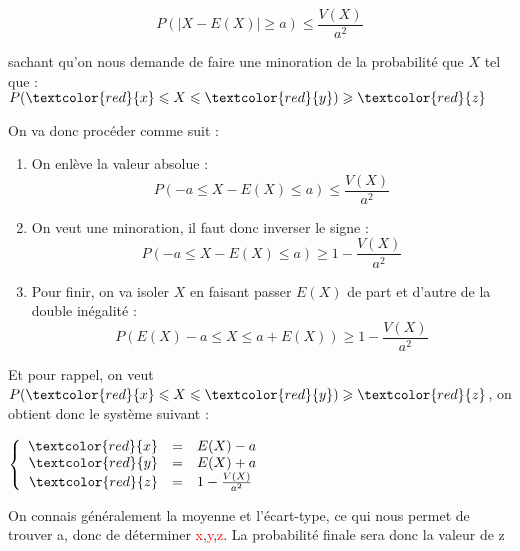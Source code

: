 \documentclass{article}
\newcommand{\argument}[1]{\textcolor{red}{#1}}
\begin{document}
\begin{equation*}
    P(|X-E(X)|\geqslant a) \leqslant \frac{V(X)}{a^2}
\end{equation*}

sachant qu'on nous demande de faire une minoration de la probabilité que $X$ tel que : $P(\argument{x} \leqslant X \leqslant \argument{y}) \geqslant \argument{z}$

On va donc procéder comme suit : 
\begin{enumerate}
    \item On enlève la valeur absolue : 
    \begin{equation*}
        P(-a \leqslant X-E(X)\leqslant a) \leqslant \frac{V(X)}{a^2}
    \end{equation*}
    \item On veut une minoration, il faut donc inverser le signe : 
    \begin{equation*}
        P(-a \leqslant X-E(X)\leqslant a) \geqslant 1 - \frac{V(X)}{a^2}
    \end{equation*}
    \item Pour finir, on va isoler $X$ en faisant passer $E(X)$ de part et d'autre de la double inégalité : 
    \begin{equation*}
        P(E(X)-a \leqslant X\leqslant a+E(X)) \geqslant 1 - \frac{V(X)}{a^2}
    \end{equation*}
\end{enumerate}
Et pour rappel, on veut $P(\argument{x} \leqslant X \leqslant \argument{y}) \geqslant \argument{z}$, on obtient donc le système suivant : \newline
\begin{center}
    $\left \{
       \begin{array}{r c l}
          \argument{x}  & = & E(X)-a \\
          \argument{y}   & = & E(X)+a \\
          \argument{z} & = & 1 - \frac{V(X)}{a^2}
       \end{array}
       \right .$
\end{center}

On connais généralement la moyenne et l'écart-type, ce qui nous permet de trouver a, donc de déterminer \argument{x},\argument{y},\argument{z}. La probabilité finale sera donc la valeur de z
\end{document}
